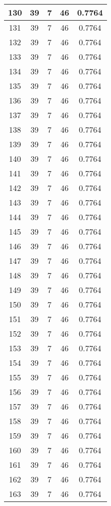 \documentclass[letterpaper, 12pt]{article}
\begin{document}
\begin{longtable}{|c|c|c|c|c|}
\hline
130 & 39 & 7 & 46 & 0.7764 \\
\hline
131 & 39 & 7 & 46 & 0.7764 \\
\hline
132 & 39 & 7 & 46 & 0.7764 \\
\hline
133 & 39 & 7 & 46 & 0.7764 \\
\hline
134 & 39 & 7 & 46 & 0.7764 \\
\hline
135 & 39 & 7 & 46 & 0.7764 \\
\hline
136 & 39 & 7 & 46 & 0.7764 \\
\hline
137 & 39 & 7 & 46 & 0.7764 \\
\hline
138 & 39 & 7 & 46 & 0.7764 \\
\hline
139 & 39 & 7 & 46 & 0.7764 \\
\hline
140 & 39 & 7 & 46 & 0.7764 \\
\hline
141 & 39 & 7 & 46 & 0.7764 \\
\hline
142 & 39 & 7 & 46 & 0.7764 \\
\hline
143 & 39 & 7 & 46 & 0.7764 \\
\hline
144 & 39 & 7 & 46 & 0.7764 \\
\hline
145 & 39 & 7 & 46 & 0.7764 \\
\hline
146 & 39 & 7 & 46 & 0.7764 \\
\hline
147 & 39 & 7 & 46 & 0.7764 \\
\hline
148 & 39 & 7 & 46 & 0.7764 \\
\hline
149 & 39 & 7 & 46 & 0.7764 \\
\hline
150 & 39 & 7 & 46 & 0.7764 \\
\hline
151 & 39 & 7 & 46 & 0.7764 \\
\hline
152 & 39 & 7 & 46 & 0.7764 \\
\hline
153 & 39 & 7 & 46 & 0.7764 \\
\hline
154 & 39 & 7 & 46 & 0.7764 \\
\hline
155 & 39 & 7 & 46 & 0.7764 \\
\hline
156 & 39 & 7 & 46 & 0.7764 \\
\hline
157 & 39 & 7 & 46 & 0.7764 \\
\hline
158 & 39 & 7 & 46 & 0.7764 \\
\hline
159 & 39 & 7 & 46 & 0.7764 \\
\hline
160 & 39 & 7 & 46 & 0.7764 \\
\hline
161 & 39 & 7 & 46 & 0.7764 \\
\hline
162 & 39 & 7 & 46 & 0.7764 \\
\hline
163 & 39 & 7 & 46 & 0.7764 \\

\end{longtable}
\end{document}
